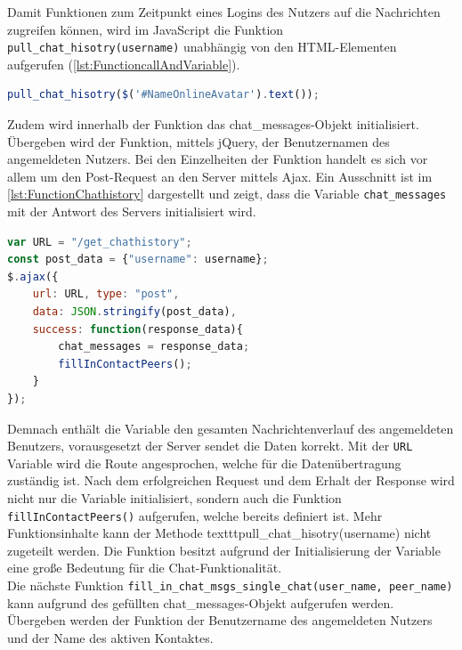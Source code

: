 \documentclass[a4paper,titlepage,halfparskip,12pt]{scrreprt}
\begin{document}
\begin{onehalfspacing}
\pagebreak

Damit Funktionen zum Zeitpunkt eines Logins des Nutzers auf die Nachrichten zugreifen können, wird im JavaScript die Funktion \texttt{pull\_chat\_hisotry(username)} unabhängig von den \ac{HTML}-Elementen aufgerufen (\autoref{lst:FunctioncallAndVariable}).
\begin{lstlisting}[language=Javascript,caption=Aufruf der Funktion \texttt{pull\_chat\_hisotry(username)},label={lst:FunctioncallAndVariable}]
pull_chat_hisotry($('#NameOnlineAvatar').text());
\end{lstlisting}
Zudem wird innerhalb der Funktion das chat\_messages-Objekt initialisiert. Übergeben wird der Funktion, mittels jQuery, der Benutzernamen des angemeldeten Nutzers.
Bei den Einzelheiten der Funktion handelt es sich vor allem um den Post-Request an den Server mittels Ajax. Ein Ausschnitt ist im \autoref{lst:FunctionChathistory} dargestellt und zeigt, dass die Variable \texttt{chat\_messages} mit der Antwort des Servers initialisiert wird.
\begin{lstlisting}[language=Javascript,caption=Ausschnitt aus der Funktion \textit{pull\_chat\_hisotry(username)} ,label={lst:FunctionChathistory}]
var URL = "/get_chathistory";
const post_data = {"username": username};
$.ajax({
	url: URL, type: "post",
	data: JSON.stringify(post_data),
	success: function(response_data){
		chat_messages = response_data;
		fillInContactPeers();
	}
});
\end{lstlisting}
Demnach enthält die Variable den gesamten Nachrichtenverlauf des angemeldeten Benutzers, vorausgesetzt der Server sendet die Daten korrekt. Mit der \texttt{URL} Variable wird die Route angesprochen, welche für die Datenübertragung zuständig ist. Nach dem erfolgreichen Request und dem Erhalt der Response wird nicht nur die Variable initialisiert, sondern auch die Funktion \texttt{fillInContactPeers()} aufgerufen, welche bereits definiert ist. Mehr Funktionsinhalte kann der Methode texttt{pull\_chat\_hisotry(username)} nicht zugeteilt werden. Die Funktion besitzt aufgrund der Initialisierung der Variable eine große Bedeutung für die Chat-Funktionalität.\\
Die nächste Funktion \texttt{fill\_in\_chat\_msgs\_single\_chat(user\_name, peer\_name)} kann aufgrund des gefüllten chat\_messages-Objekt aufgerufen werden. Übergeben werden der Funktion der Benutzername des angemeldeten Nutzers und der Name des aktiven Kontaktes. 
\begin{lstlisting}[language=Javascript,caption=Ausschnitt aus der Funktion \texttt{pull\_chat\_hisotry(username)} ,label={lst:FunctionFillInChat}]

\end{lstlisting}
\end{onehalfspacing}
\end{document}
